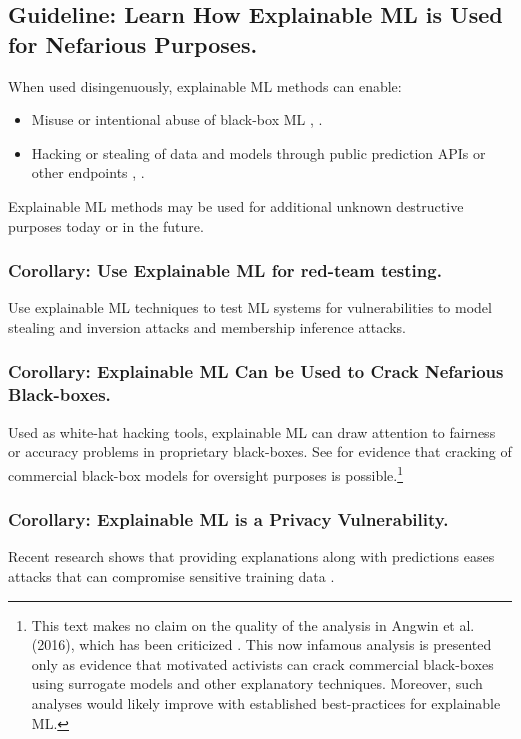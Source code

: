 \documentclass[sigconf]{acmart}
\begin{document}
\subsection{Guideline: Learn How Explainable ML is Used for Nefarious Purposes.} \label{sec:nefarious}

When used disingenuously, explainable ML methods can enable:
\begin{itemize}
\item Misuse or intentional abuse of black-box ML \cite{fair_washing}, \cite{please_stop}.
\item Hacking or stealing of data and models through public prediction APIs or other endpoints \cite{membership_inference}, \cite{model_stealing}. 
\end{itemize}
\noindent Explainable ML methods may be used for additional unknown destructive purposes today or in the future. 

\subsubsection{Corollary: Use Explainable ML for red-team testing.} Use explainable ML techniques to test ML systems for vulnerabilities to model stealing and inversion attacks and membership inference attacks. 

\subsubsection{Corollary: Explainable ML Can be Used to Crack Nefarious Black-boxes.} Used as white-hat hacking tools, explainable ML can draw attention to fairness or accuracy problems in proprietary black-boxes. See \citet{angwin16} for evidence that cracking of commercial black-box models for oversight purposes is possible.\footnote{This text makes no claim on the quality of the analysis in Angwin et al. (2016), which has been criticized \cite{flores2016false}. This now infamous analysis is presented only as evidence that motivated activists can crack commercial black-boxes using surrogate models and other explanatory techniques. Moreover, such analyses would likely improve with established best-practices for explainable ML.} 

\subsubsection{Corollary: Explainable ML is a Privacy Vulnerability.} Recent research shows that providing explanations along with predictions eases attacks that can compromise sensitive training data \cite{shokri2019privacy}. 
\end{document}
